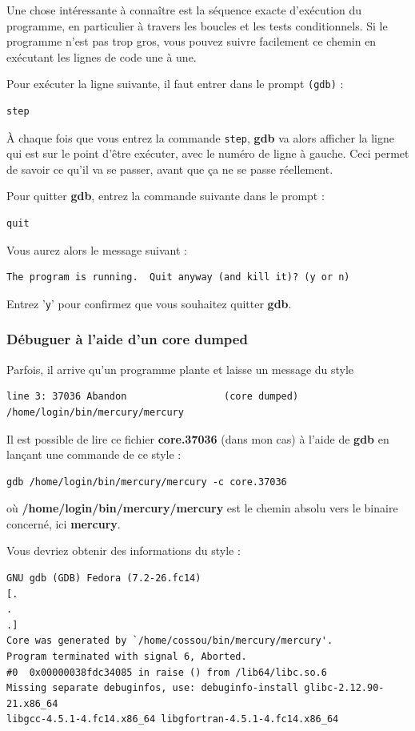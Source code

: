 \documentclass[a4paper,twoside]{article}
\begin{document}
\bigskip

Une chose intéressante à connaître est la séquence exacte d'exécution du programme, en particulier à travers les boucles et les tests conditionnels. Si le programme n'est pas trop gros, vous pouvez suivre facilement ce chemin en exécutant les lignes de code une à une. 

Pour exécuter la ligne suivante, il faut entrer dans le prompt \texttt{(gdb)} :
\begin{verbatim}
step
\end{verbatim}

À chaque fois que vous entrez la commande \texttt{step}, \textbf{gdb} va alors afficher la ligne qui est sur le point d'être exécuter, avec le numéro de ligne à gauche. Ceci permet de savoir ce qu'il va se passer, avant que ça ne se passe réellement.

\bigskip

Pour quitter \textbf{gdb}, entrez la commande suivante dans le prompt : 
\begin{verbatim}
quit
\end{verbatim}
Vous aurez alors le message suivant : 
\begin{verbatim}
The program is running.  Quit anyway (and kill it)? (y or n)
\end{verbatim}
Entrez '\texttt{y}' pour confirmez que vous souhaitez quitter \textbf{gdb}.

\subsubsection{Débuguer à l'aide d'un core dumped}
Parfois, il arrive qu'un programme plante et laisse un message du style
\begin{verbatim}
line 3: 37036 Abandon                 (core dumped) /home/login/bin/mercury/mercury
\end{verbatim}

Il est possible de lire ce fichier \textbf{core.37036} (dans mon cas) à l'aide de \textbf{gdb} en lançant une commande de ce style :
\begin{verbatim}
gdb /home/login/bin/mercury/mercury -c core.37036 
\end{verbatim}
où \textbf{/home/login/bin/mercury/mercury} est le chemin absolu vers le binaire concerné, ici \textbf{mercury}.

Vous devriez obtenir des informations du style :
\begin{verbatim}
GNU gdb (GDB) Fedora (7.2-26.fc14)
[.
.
.]
Core was generated by `/home/cossou/bin/mercury/mercury'.
Program terminated with signal 6, Aborted.
#0  0x00000038fdc34085 in raise () from /lib64/libc.so.6
Missing separate debuginfos, use: debuginfo-install glibc-2.12.90-21.x86_64 
libgcc-4.5.1-4.fc14.x86_64 libgfortran-4.5.1-4.fc14.x86_64
\end{verbatim}
\end{document}
